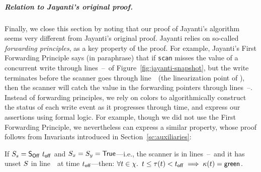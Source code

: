 

\subparagraph*{Relation to Jayanti's original proof.}
\label{sec:relat-jayant-orig}
%
Finally, we close this section by noting that our proof of Jayanti's
algorithm seems very different from Jayanti's original proof. Jayanti
relies on so-called \emph{forwarding principles}, as a key property of
the proof. For example, Jayanti's First Forwarding Principle says (in
paraphrase) that if {\tt scan} misses the value of a concurrent write
through lines~\lineScanReadsX--\lineScanReadsY\ of
Figure~\ref{fig:jayanti-snapshot}, but the write terminates before the
scanner goes through line~\lineScanUnsetsS\ (the linearization point
of \jyscan), then the scanner will catch the value in the forwarding
pointers through lines~\lineScanReadsFX--\lineScanReadsFY.
%
Instead of forwarding principles, we rely on colors to algorithmically
construct the status of each write event as it progresses through
time, and express our assertions using formal logic. For example,
though we did not use the First Forwarding Principle, we nevertheless
can express a similar property, whose proof follows from
Invariants introduced in Section~\ref{sc:auxiliaries}:
%
\begin{proposition}\label{inv:fwd1}%
If $S_s = \mathsf{S_{Off}}\ t_{\mathsf{off}}$ and $S_x = S_y = \mathsf{True}$---i.e., the scanner is
in lines~\lineScanReadsFX--\lineScanChoosesRY\ and it has unset $S$
in line~\lineScanUnsetsS\ at time $t_{\mathsf{off}}$---then: $ \forall t \in
\chi\mathord{.}\,\ t \leq \tau(t)< t_{\mathsf{off}} \implies \kappa(t)= \mathsf{green}$.
\end{proposition}

